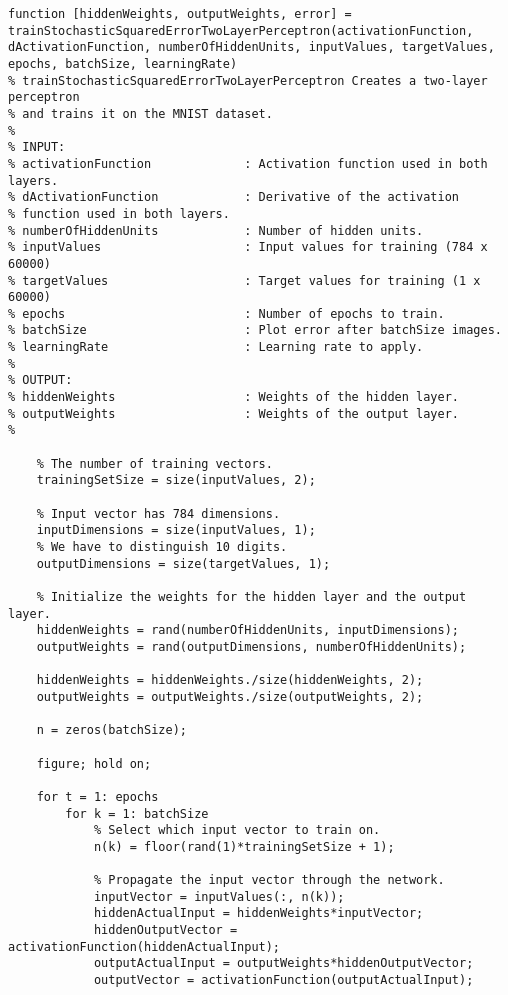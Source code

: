 \documentclass[twoside,11pt,a4paper]{article}
\begin{document}
\begin{lstlisting}[label={lst:train-two-layer-perceptron}]
function [hiddenWeights, outputWeights, error] = trainStochasticSquaredErrorTwoLayerPerceptron(activationFunction, dActivationFunction, numberOfHiddenUnits, inputValues, targetValues, epochs, batchSize, learningRate)
% trainStochasticSquaredErrorTwoLayerPerceptron Creates a two-layer perceptron
% and trains it on the MNIST dataset.
%
% INPUT:
% activationFunction             : Activation function used in both layers.
% dActivationFunction            : Derivative of the activation
% function used in both layers.
% numberOfHiddenUnits            : Number of hidden units.
% inputValues                    : Input values for training (784 x 60000)
% targetValues                   : Target values for training (1 x 60000)
% epochs                         : Number of epochs to train.
% batchSize                      : Plot error after batchSize images.
% learningRate                   : Learning rate to apply.
%
% OUTPUT:
% hiddenWeights                  : Weights of the hidden layer.
% outputWeights                  : Weights of the output layer.
% 

    % The number of training vectors.
    trainingSetSize = size(inputValues, 2);
    
    % Input vector has 784 dimensions.
    inputDimensions = size(inputValues, 1);
    % We have to distinguish 10 digits.
    outputDimensions = size(targetValues, 1);
    
    % Initialize the weights for the hidden layer and the output layer.
    hiddenWeights = rand(numberOfHiddenUnits, inputDimensions);
    outputWeights = rand(outputDimensions, numberOfHiddenUnits);
    
    hiddenWeights = hiddenWeights./size(hiddenWeights, 2);
    outputWeights = outputWeights./size(outputWeights, 2);
    
    n = zeros(batchSize);
    
    figure; hold on;

    for t = 1: epochs
        for k = 1: batchSize
            % Select which input vector to train on.
            n(k) = floor(rand(1)*trainingSetSize + 1);
            
            % Propagate the input vector through the network.
            inputVector = inputValues(:, n(k));
            hiddenActualInput = hiddenWeights*inputVector;
            hiddenOutputVector = activationFunction(hiddenActualInput);
            outputActualInput = outputWeights*hiddenOutputVector;
            outputVector = activationFunction(outputActualInput);
            

\end{lstlisting}
\end{document}
